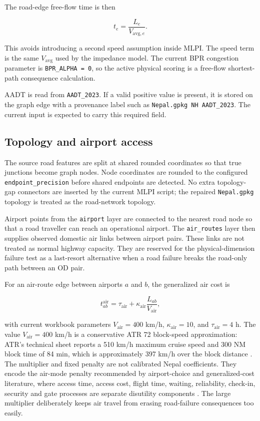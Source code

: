 \documentclass[11pt,a4paper]{article}
\begin{document}
The road-edge free-flow time is then

\begin{equation}
t_e=\frac{L_e}{V_{\mathrm{avg},e}}.
\label{eq:mlpi-road-time}
\end{equation}

This avoids introducing a second speed assumption inside MLPI. The speed term is
the same $V_{\mathrm{avg}}$ used by the impedance model. The current BPR
congestion parameter is \texttt{BPR\_ALPHA = 0}, so the active physical scoring
is a free-flow shortest-path consequence calculation.

AADT is read from \texttt{AADT\_2023}. If a valid positive value is present, it
is stored on the graph edge with a provenance label such as
\texttt{Nepal.gpkg NH AADT\_2023}. The current input is expected to carry this
required field.

\subsection{Topology and airport access}

The source road features are split at shared rounded coordinates so that true
junctions become graph nodes. Node coordinates are rounded to the configured
\texttt{endpoint\_precision} before shared endpoints are detected. No extra
topology-gap connectors are inserted by the current MLPI script; the repaired
\texttt{Nepal.gpkg} topology is treated as the road-network topology.

Airport points from the \texttt{airport} layer are connected to the nearest
road node so that a road traveller can reach an operational airport. The
\texttt{air\_routes} layer then supplies observed domestic air links between
airport pairs. These links are not treated as normal highway capacity. They are
reserved for the physical-dimension failure test as a last-resort alternative
when a road failure breaks the road-only path between an OD pair.

For an air-route edge between airports $a$ and $b$, the generalized air cost is

\begin{equation}
t^{\mathrm{air}}_{ab}
=\tau_{\mathrm{air}}+\kappa_{\mathrm{air}}
\frac{L_{ab}}{V_{\mathrm{air}}},
\label{eq:mlpi-air-cost}
\end{equation}

with current workbook parameters $V_{\mathrm{air}}=400$ km/h,
$\kappa_{\mathrm{air}}=10$, and $\tau_{\mathrm{air}}=4$ h. The value
$V_{\mathrm{air}}=400$ km/h is a conservative ATR 72 block-speed approximation:
ATR's technical sheet reports a 510 km/h maximum cruise speed and 300 NM block
time of 84 min, which is approximately 397 km/h over the block distance
\cite{atr2020}. The multiplier and fixed penalty are not calibrated Nepal
coefficients. They encode the air-mode penalty recommended by airport-choice
and generalized-cost literature, where access time, access cost, flight time,
waiting, reliability, check-in, security and gate processes are separate
disutility components \cite{kouwenhoven2008,koster2011,adler2005,acrp2015}.
The large multiplier deliberately keeps air travel from erasing road-failure
consequences too easily.
\end{document}
